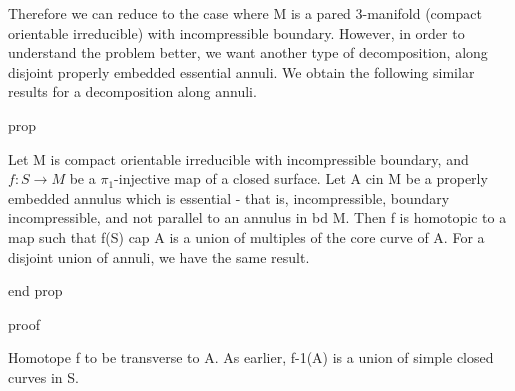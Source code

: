 Therefore we can reduce to the case where M is a pared 3-manifold (compact
orientable irreducible) with incompressible boundary. However, in order to
understand the problem better, we want another type of decomposition, along
disjoint properly embedded essential annuli. We obtain the following similar
results for a decomposition along annuli.

prop

Let M is compact orientable irreducible with incompressible boundary, and $f
\colon S \to M$ be a $\pi_1$-injective map of a closed surface. Let A cin M be
a properly embedded annulus which is essential - that is, incompressible,
boundary incompressible, and not parallel to an annulus in bd M. Then f is
homotopic to a map such that f(S) cap A is a union of multiples of the core
curve of A. For a disjoint union of annuli, we have the same result.

end prop

proof

Homotope f to be transverse to A. As earlier, f-1(A) is a union of simple
closed curves in S.
